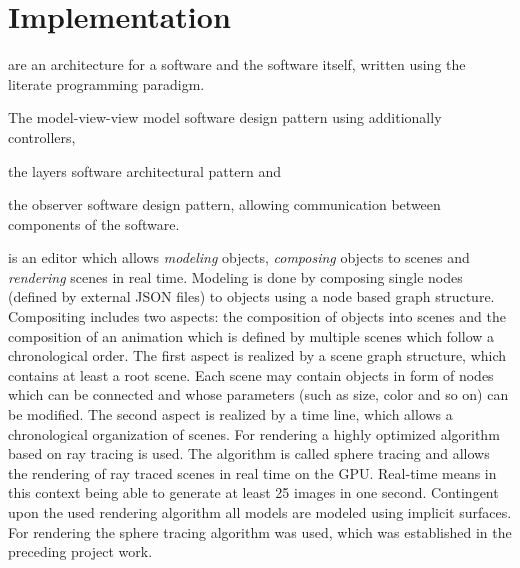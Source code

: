 
\section{Implementation}

 are an architecture for a software and
the software itself, written using the literate programming paradigm.
\begin{enumerate*}
  \item The model-view-view model software design pattern using additionally
    controllers,
  \item the layers software architectural pattern and
  \item the observer software design pattern, allowing communication between
    components of the software.
\end{enumerate*}
 is an editor which allows \emph{modeling}
objects, \emph{composing} objects to scenes and \emph{rendering} scenes in real
time. Modeling is done by composing single nodes (defined by external JSON
files) to objects using a node based graph structure. Compositing includes two
aspects: the composition of objects into scenes and the composition of an
animation which is defined by multiple scenes which follow a chronological
order. The first aspect is realized by a scene graph structure, which contains
at least a root scene. Each scene may contain objects in form of nodes which can
be connected and whose parameters (such as size, color and so on) can be
modified. The second aspect is realized by a time line, which allows a
chronological organization of scenes. For rendering a highly optimized algorithm
based on ray tracing is used. The algorithm is called sphere tracing and allows
the rendering of ray traced scenes in real time on the GPU. Real-time means in
this context being able to generate at least 25 images in one second. Contingent
upon the used rendering algorithm all models are modeled using implicit
surfaces. For rendering the sphere tracing algorithm was used, which was
established in the preceding project work.




